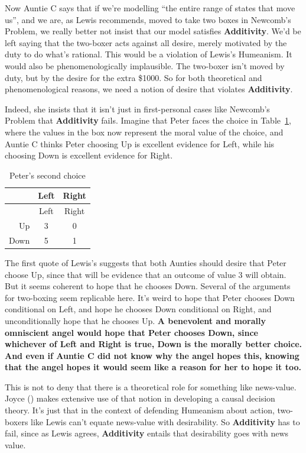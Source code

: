 \documentclass[
  11pt,
  letterpaper,
  DIV=11,
  numbers=noendperiod,
  twoside]{scrartcl}
\begin{document}
Now Auntie C says that if we're modelling ``the entire range of states
that move us'', and we are, as Lewis recommends, moved to take two boxes
in Newcomb's Problem, we really better not insist that our model
satisfies \textbf{Additivity}. We'd be left saying that the two-boxer
acts against all desire, merely motivated by the duty to do what's
rational. This would be a violation of Lewis's Humeanism. It would also
be phenomenologically implausible. The two-boxer isn't moved by duty,
but by the desire for the extra \$1000. So for both theoretical and
phenomenological reasons, we need a notion of desire that violates
\textbf{Additivity}.

Indeed, she insists that it isn't just in first-personal cases like
Newcomb's Problem that \textbf{Additivity} fails. Imagine that Peter
faces the choice in Table~\ref{tbl-peter-second}, where the values in
the box now represent the moral value of the choice, and Auntie C thinks
Peter choosing Up is excellent evidence for Left, while his choosing
Down is excellent evidence for Right.

\begin{longtable}[]{@{}rcc@{}}
\caption{Peter's second choice}\label{tbl-peter-second}\tabularnewline
\toprule\noalign{}
& Left & Right \\
\midrule\noalign{}
\endfirsthead
\toprule\noalign{}
& Left & Right \\
\midrule\noalign{}
\endhead
\bottomrule\noalign{}
\endlastfoot
Up & 3 & 0 \\
Down & 5 & 1 \\
\end{longtable}

The first quote of Lewis's suggests that both Aunties should desire that
Peter choose Up, since that will be evidence that an outcome of value 3
will obtain. But it seems coherent to hope that he chooses Down. Several
of the arguments for two-boxing seem replicable here. It's weird to hope
that Peter chooses Down conditional on Left, and hope he chooses Down
conditional on Right, and unconditionally hope that he chooses Up.
{\bfseries\boldmath{}A benevolent and morally omniscient angel would
hope that Peter chooses Down, since whichever of Left and Right is true,
Down is the morally better choice. And even if Auntie C did not know why
the angel hopes this, knowing that the angel hopes it would seem like a
reason for her to hope it too.}

This is not to deny that there is a theoretical role for something like
news-value. Joyce () makes extensive use
of that notion in developing a causal decision theory. It's just that in
the context of defending Humeanism about action, two-boxers like Lewis
can't equate news-value with desirability. So \textbf{Additivity} has to
fail, since as Lewis agrees, \textbf{Additivity} entails that
desirability goes with news value.
\end{document}
